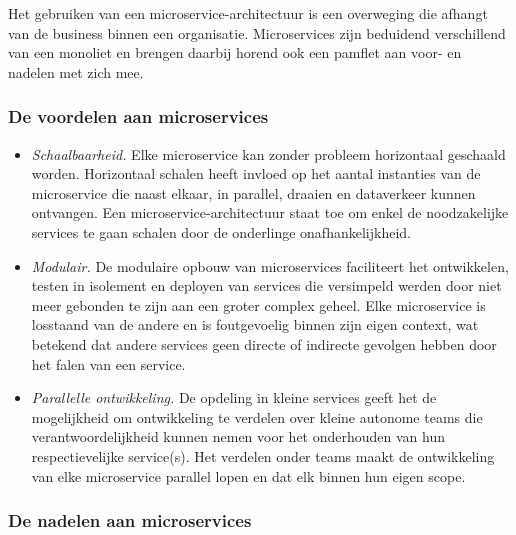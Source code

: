 Het gebruiken van een microservice-architectuur is een overweging die afhangt van de business binnen een organisatie. Microservices zijn beduidend verschillend van een monoliet en brengen daarbij horend ook een pamflet aan voor- en nadelen met zich mee.

\subsubsection{De voordelen aan microservices}
\label{subsubsec:voordelen-microservices}

\begin{itemize}[label=$\bullet$]
    \item \emph{Schaalbaarheid.}
    Elke microservice kan zonder probleem horizontaal geschaald worden. Horizontaal schalen heeft invloed op het aantal instanties van de microservice die naast elkaar, in parallel, draaien en dataverkeer kunnen ontvangen. Een microservice-architectuur staat toe om enkel de noodzakelijke services te gaan schalen door de onderlinge onafhankelijkheid.
    \newline
    
    \item \emph{Modulair.}
    De modulaire opbouw van microservices faciliteert het ontwikkelen, testen in isolement en deployen van services die versimpeld werden door niet meer gebonden te zijn aan een groter complex geheel. Elke microservice is losstaand van de andere en is foutgevoelig binnen zijn eigen context, wat betekend dat andere services geen directe of indirecte gevolgen hebben door het falen van een service.
    \newline

    \item \emph{Parallelle ontwikkeling.}
    De opdeling in kleine services geeft het de mogelijkheid om ontwikkeling te verdelen over kleine autonome teams die verantwoordelijkheid kunnen nemen voor het   onderhouden van hun respectievelijke service(s). Het verdelen onder teams maakt de ontwikkeling van elke microservice parallel lopen en dat elk binnen hun eigen scope.
\end{itemize}

\subsubsection{De nadelen aan microservices}
\label{subsubsec:nadelen-microservices}


